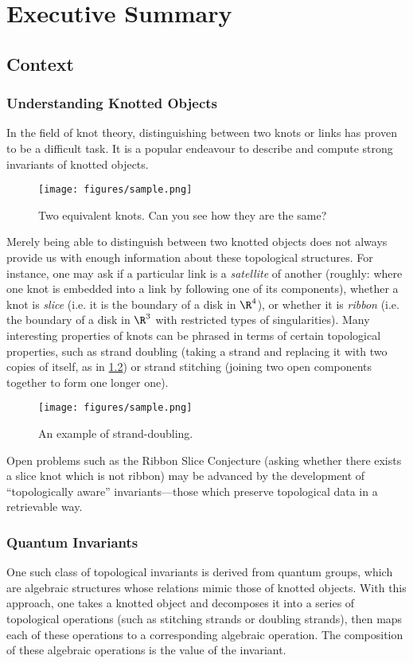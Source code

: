 \chapter{Executive Summary}
\label{ch:summary}

\section{Context}
\subsection{Understanding Knotted Objects}
In the field of knot theory, distinguishing between two knots or links
has proven to be a difficult task. It is a popular endeavour to describe and
compute strong invariants of knotted objects.
\begin{figure}[h]
        \centering
        \texttt{[image: figures/sample.png]}%
        \caption{Two equivalent knots. Can you see how they are the same?}
        \label{fig:unknot}
\end{figure}

Merely being able to distinguish between two knotted objects does not always
provide us with enough information about these topological structures. For
instance, one may ask if a particular link is a \emph{satellite} of another
(roughly: where one knot is embedded into a link by following one of its
components), whether a knot is \emph{slice} (i.e. it is the boundary of a disk in
$\R^4$), or whether it is \emph{ribbon} (i.e. the boundary of a disk in $\R^3$
with restricted types of singularities). Many interesting properties of knots
can be phrased in terms of certain topological properties, such as strand
doubling (taking a strand and replacing it with two copies of itself, as in
\cref{fig:strand_double}) or strand stitching (joining two open components
together to form one longer one).
\begin{figure}[h]
        \centering
        \texttt{[image: figures/sample.png]}%
        \caption{An example of strand-doubling.}
        \label{fig:strand_double}
\end{figure}

Open problems such as the Ribbon Slice Conjecture (asking whether there exists a
slice knot which is not ribbon) may be advanced by the development of
\enquote{topologically aware} invariants---those which preserve topological data
in a retrievable way.

\subsection{Quantum Invariants}
One such class of topological invariants is derived from quantum groups, which
are algebraic structures whose relations mimic those of knotted objects. With
this approach, one takes a knotted object and decomposes it into a series of
topological operations (such as stitching strands or doubling strands), then
maps each of these operations to a corresponding algebraic operation. The
composition of these algebraic operations is the value of the invariant.

